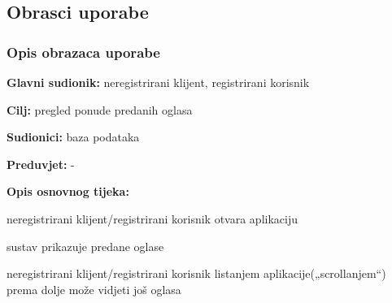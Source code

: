 \eject 



\subsection{Obrasci uporabe}


\subsubsection{Opis obrazaca uporabe}


\noindent {}
\begin{packed_item}
	
	\item \textbf{Glavni sudionik: } neregistrirani klijent, registrirani korisnik
	\item  \textbf{Cilj:} pregled ponude predanih oglasa
	\item  \textbf{Sudionici:} baza podataka
	\item  \textbf{Preduvjet:} -
	\item  \textbf{Opis osnovnog tijeka:}
	
	\item[] \begin{packed_enum}
		
		\item neregistrirani klijent/registrirani korisnik otvara aplikaciju
		\item sustav prikazuje predane oglase
		\item  neregistrirani klijent/registrirani korisnik listanjem aplikacije(„scrollanjem“) prema dolje može vidjeti još oglasa
		
	\end{packed_enum}
	
\end{packed_item}


